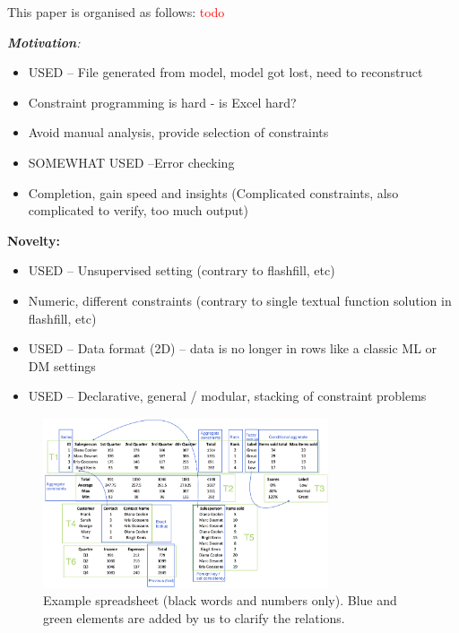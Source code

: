 \documentclass{sig-alternate-05-2015}
\newcommand{\luc}[1]{{\textcolor{red}{#1}}}
\begin{document}
This paper is organised as follows: \luc{todo}


{\it
\textbf{Motivation}:
\begin{itemize}
  \item USED -- File generated from model, model got lost, need to reconstruct
  \item Constraint programming is hard - is Excel hard?
  \item Avoid manual analysis, provide selection of constraints
  \item SOMEWHAT USED --Error checking
  \item Completion, gain speed and insights (Complicated constraints, also complicated to verify, too much output)
\end{itemize}

\textbf{Novelty:}
\begin{itemize}
  \item USED -- Unsupervised setting (contrary to flashfill, etc)
  \item Numeric, different constraints (contrary to single textual function solution in flashfill, etc)
  \item USED -- Data format (2D) -- data is no longer in rows like a classic ML or DM settings
  \item USED -- Declarative, general / modular, stacking of constraint problems
\end{itemize}

\begin{figure}[tbh]
  \begin{center}
    \includegraphics[width=0.75\textwidth]{figures/Demo.png}
  \end{center}
  \vspace{-10pt}
  \caption{Example spreadsheet (black words and numbers only). Blue and green elements are added by us to clarify the relations.}
  \label{fig:main_example}
\end{figure}
}
\end{document}
